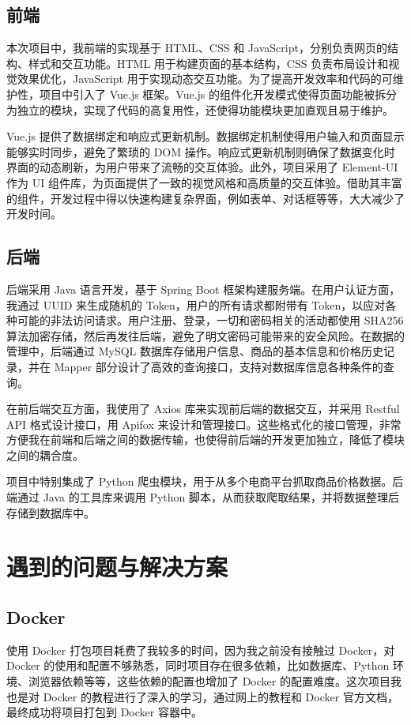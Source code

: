 \documentclass[12pt]{article}
\begin{document}
\subsection{前端}
本次项目中，我前端的实现基于 HTML、CSS 和 JavaScript，分别负责网页的结构、样式和交互功能。HTML 用于构建页面的基本结构，CSS 负责布局设计和视觉效果优化，JavaScript 用于实现动态交互功能。为了提高开发效率和代码的可维护性，项目中引入了 Vue.js 框架。Vue.js 的组件化开发模式使得页面功能被拆分为独立的模块，实现了代码的高复用性，还使得功能模块更加直观且易于维护。  

Vue.js 提供了数据绑定和响应式更新机制。数据绑定机制使得用户输入和页面显示能够实时同步，避免了繁琐的 DOM 操作。响应式更新机制则确保了数据变化时界面的动态刷新，为用户带来了流畅的交互体验。此外，项目采用了 Element-UI 作为 UI 组件库，为页面提供了一致的视觉风格和高质量的交互体验。借助其丰富的组件，开发过程中得以快速构建复杂界面，例如表单、对话框等等，大大减少了开发时间。

\subsection{后端}
后端采用 Java 语言开发，基于 Spring Boot 框架构建服务端。在用户认证方面，我通过 UUID 来生成随机的 Token，用户的所有请求都附带有 Token，以应对各种可能的非法访问请求。用户注册、登录，一切和密码相关的活动都使用 SHA256 算法加密存储，然后再发往后端，避免了明文密码可能带来的安全风险。在数据的管理中，后端通过 MySQL 数据库存储用户信息、商品的基本信息和价格历史记录，并在 Mapper 部分设计了高效的查询接口，支持对数据库信息各种条件的查询。

在前后端交互方面，我使用了 Axios 库来实现前后端的数据交互，并采用 Restful API 格式设计接口，用 Apifox 来设计和管理接口。这些格式化的接口管理，非常方便我在前端和后端之间的数据传输，也使得前后端的开发更加独立，降低了模块之间的耦合度。

项目中特别集成了 Python 爬虫模块，用于从多个电商平台抓取商品价格数据。后端通过 Java 的工具库来调用 Python 脚本，从而获取爬取结果，并将数据整理后存储到数据库中。

\section{遇到的问题与解决方案}

\subsection{Docker}
使用 Docker 打包项目耗费了我较多的时间，因为我之前没有接触过 Docker，对 Docker 的使用和配置不够熟悉，同时项目存在很多依赖，比如数据库、Python 环境、浏览器依赖等等，这些依赖的配置也增加了 Docker 的配置难度。这次项目我也是对 Docker 的教程进行了深入的学习，通过网上的教程和 Docker 官方文档，最终成功将项目打包到 Docker 容器中。
\end{document}
